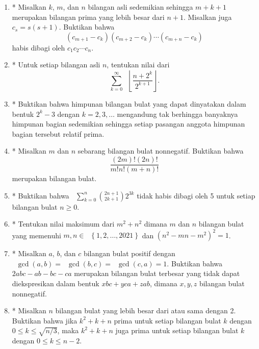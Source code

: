 \documentclass[12pt]{article}
\newcommand*\lrbr[1]{\mathop{}\!\left\lbrace#1\right\rbrace}
\newcommand*\floor[1]{\mathop{}\!\left\lfloor{#1}\right\rfloor}
\newcommand*\func[2]{\mathop{}\!{#1}{\left({#2}\right)}}
\newcommand*\ds[1]{\mathop{}\!\displaystyle{{#1}}}
\begin{document}
\begin{enumerate}[leftmargin=*]
		
		
		
		
		
		
		
		
		
		
		
		
		
		
		
		
		\item* Misalkan $ k $, $ m $, dan $ n $ bilangan asli sedemikian sehingga $ m + k + 1 $ merupakan bilangan prima yang lebih besar dari $ n + 1 $. Misalkan juga $ c_{s} = s\left(s + 1\right) $. Buktikan bahwa
		\[ \left(c_{m + 1} - c_{k}\right)\left(c_{m + 2} - c_{k}\right) \cdots \left(c_{m + n} - c_{k}\right) \]
		habis dibagi oleh $ c_{1}c_{2} \cdots c_{n} $.
		\item* Untuk setiap bilangan asli $ n $, tentukan nilai dari
		\[ \sum_{k = 0}^{\infty}{\floor{\frac{n + 2^{k}}{2^{k + 1}}}}. \]
		\item* Buktikan bahwa himpunan bilangan bulat yang dapat dinyatakan dalam bentuk $ 2^{k} - 3 $ dengan $ k = 2, 3, \dots $ mengandung tak berhingga banyaknya himpunan bagian sedemikian sehingga setiap pasangan anggota himpunan bagian tersebut relatif prima.
		\item* Misalkan $ m $ dan $ n $ sebarang bilangan bulat nonnegatif. Buktikan bahwa
		\[ \frac{\left(2m\right)!\left(2n\right)!}{m!n!\left(m + n\right)!} \]
		merupakan bilangan bulat.
		\item* Buktikan bahwa $ \ds{\sum_{k = 0}^{n}{\binom{2n + 1}{2k + 1}2^{3k}}} $ tidak habis dibagi oleh 5 untuk setiap bilangan bulat $ n \geq 0 $.
		\item* Tentukan nilai maksimum dari $ m^{2} + n^{2} $ dimana $ m $ dan $ n $ bilangan bulat yang memenuhi $ m, n \in \lrbr{1, 2, \dots, 2021} $ dan $ \left(n^{2} - mn - m^{2}\right)^{2} = 1 $.
		\item* Misalkan $ a $, $ b $, dan $ c $ bilangan bulat positif dengan $ \func{\gcd}{a, b} = \func{\gcd}{b, c} = \func{\gcd}{c, a} = 1 $. Buktikan bahwa $ 2abc - ab - bc - ca $ merupakan bilangan bulat terbesar yang tidak dapat diekspresikan dalam bentuk $ xbc + yca + zab $, dimana $ x, y, z $ bilangan bulat nonnegatif.
		\item* Misalkan $ n $ bilangan bulat yang lebih besar dari atau sama dengan 2. Buktikan bahwa jika $ k^{2} + k + n $ prima untuk setiap bilangan bulat $ k $ dengan $ 0 \leq k \leq \sqrt{n/3} $, maka $ k^{2} + k + n $ juga prima untuk setiap bilangan bulat $ k $ dengan $ 0 \leq k \leq n - 2 $.

\end{enumerate}
\end{document}
